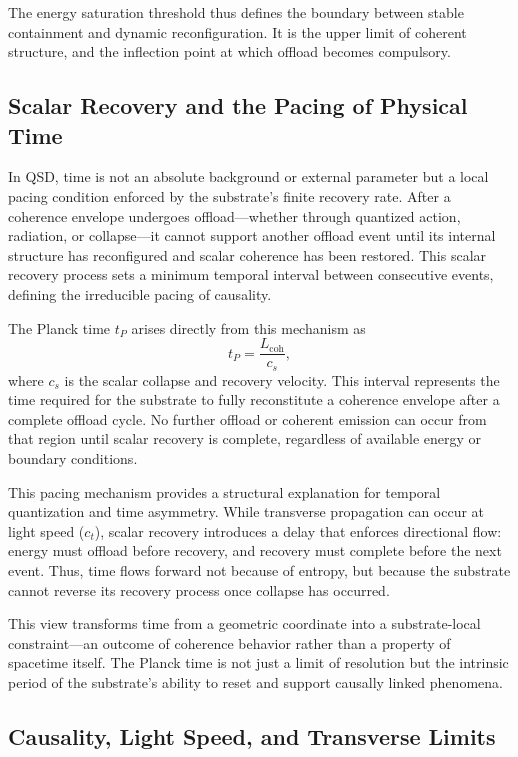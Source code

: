 \documentclass[entropy,article,submit,pdftex,moreauthors]{Definitions/mdpi}
\begin{document}
The energy saturation threshold thus defines the boundary between stable containment and dynamic reconfiguration. It is the upper limit of coherent structure, and the inflection point at which offload becomes compulsory.
\subsection{Scalar Recovery and the Pacing of Physical Time}

In QSD, time is not an absolute background or external parameter but a local pacing condition enforced by the substrate’s finite recovery rate. After a coherence envelope undergoes offload—whether through quantized action, radiation, or collapse—it cannot support another offload event until its internal structure has reconfigured and scalar coherence has been restored. This scalar recovery process sets a minimum temporal interval between consecutive events, defining the irreducible pacing of causality.

The Planck time \texorpdfstring{\( t_P \)}{tP} arises directly from this mechanism as
\[
t_P = \frac{L_{\text{coh}}}{c_s},
\]
where \texorpdfstring{\( c_s \)}{cs} is the scalar collapse and recovery velocity. This interval represents the time required for the substrate to fully reconstitute a coherence envelope after a complete offload cycle. No further offload or coherent emission can occur from that region until scalar recovery is complete, regardless of available energy or boundary conditions.

This pacing mechanism provides a structural explanation for temporal quantization and time asymmetry. While transverse propagation can occur at light speed (\texorpdfstring{\( c_t \)}{ct}), scalar recovery introduces a delay that enforces directional flow: energy must offload before recovery, and recovery must complete before the next event. Thus, time flows forward not because of entropy, but because the substrate cannot reverse its recovery process once collapse has occurred.

This view transforms time from a geometric coordinate into a substrate-local constraint—an outcome of coherence behavior rather than a property of spacetime itself. The Planck time is not just a limit of resolution but the intrinsic period of the substrate’s ability to reset and support causally linked phenomena.
\subsection{Causality, Light Speed, and Transverse Limits}
\end{document}
